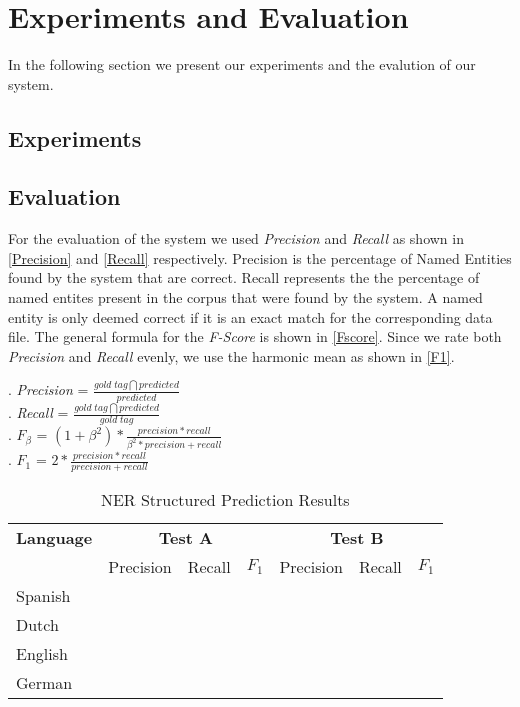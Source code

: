 \documentclass[11pt]{article}
\begin{document}
\section{Experiments and Evaluation}
In the following section we present our experiments and the evalution of our system.
\subsection*{Experiments}


\subsection*{Evaluation}
For the evaluation of the system we used \emph{Precision} and \emph{Recall} as shown in \ref{Precision} and \ref{Recall} respectively.
Precision is the percentage of Named Entities found by the system that are correct. Recall represents the the percentage of 
named entites present in the corpus that were found by the system. 
A named entity is only deemed correct if it is an exact match for the corresponding data file.
The general formula for the \emph{F-Score} is shown in \ref{Fscore}. Since we rate both \emph{Precision} and \emph{Recall} evenly, we 
use the harmonic mean as shown in \ref{F1}.


\ex. \emph{Precision} = $ \frac{gold\; tag \bigcap predicted}{predicted}$ \label{Precision}\\


\ex. \emph{Recall} = $ \frac{gold \;tag \bigcap predicted}{gold\; tag}$ \label{Recall}\\


\ex. $F_{\beta}$ = $ (1+\beta^2)*\frac{precision *recall}{\beta^2* precision + recall}$ \label{Fscore}\\

\ex. $F_1$ = $ 2*\frac{precision *recall}{precision + recall}$ \label{F1}\\




\begin{table}[h!]
\scriptsize
\begin{tabular}{| l | l l l| l l l |}

\hline
\bf Language & \multicolumn{3}{c|}{ \bf Test A}&\multicolumn{3}{c|}{ \bf Test B}\\
             & Precision & Recall & $F_1$ & Precision & Recall & $F_1$ \\ \hline
Spanish &       &          &     &          &               & \\
Dutch  &         &          &     &          &               &   \\
English &        &          &     &          &               &       \\
German &      &          &       &          &             & \\
\hline
\end{tabular}
\caption{NER Structured Prediction Results }
\label{table:Results}
\end{table}
\end{document}
